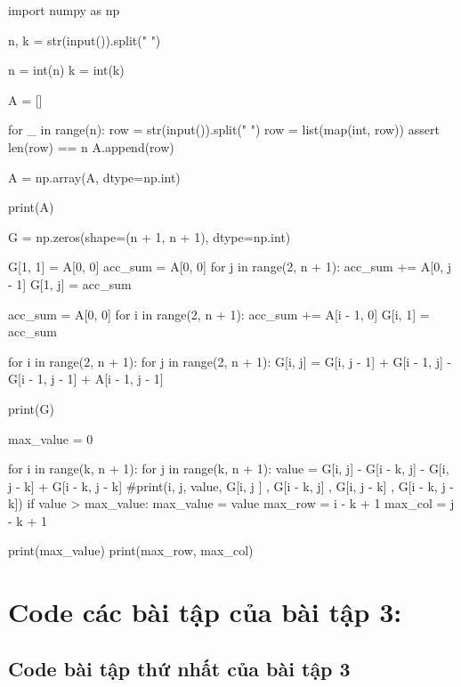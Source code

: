 \documentclass[14pt, a4paper]{article}
\theoremstyle{sltheorem}
\theoremstyle{soltheorem}
\begin{document}
    \begin{python}
import numpy as np
        
n, k = str(input()).split(" ")
                    
n = int(n)
k = int(k)
                    
A = []
                    
for _ in range(n):
    row = str(input()).split(" ")
    row = list(map(int, row))
    assert len(row) == n
    A.append(row)
                    
A = np.array(A, dtype=np.int)
                    
print(A)
                    
G = np.zeros(shape=(n + 1, n + 1), dtype=np.int)
                    
G[1, 1] = A[0, 0]
acc_sum = A[0, 0]
for j in range(2, n + 1):
    acc_sum += A[0, j - 1]
    G[1, j] = acc_sum
                    
acc_sum = A[0, 0]
for i in range(2, n + 1):
    acc_sum += A[i - 1, 0]
    G[i, 1] = acc_sum
                    
for i in range(2, n + 1):
    for j in range(2, n + 1):
        G[i, j] = G[i, j - 1] + G[i - 1, j] - G[i - 1, j - 1] + A[i - 1, j - 1]
                    
                    
print(G)
                    
max_value = 0
                    
for i in range(k, n + 1):
    for j in range(k, n + 1):
        value = G[i, j] - G[i - k, j] - G[i, j - k] + G[i - k, j - k]
        #print(i, j, value, G[i, j ] , G[i - k, j] , G[i, j - k] , G[i - k, j - k])
        if value > max_value:
            max_value = value
            max_row = i - k + 1
            max_col = j - k + 1
                    
print(max_value)
print(max_row, max_col)
        \end{python}

\section{Code các bài tập của bài tập 3:}

\subsection{Code bài tập thứ nhất của bài tập 3} \label{code-1-ex-3}
\end{document}

